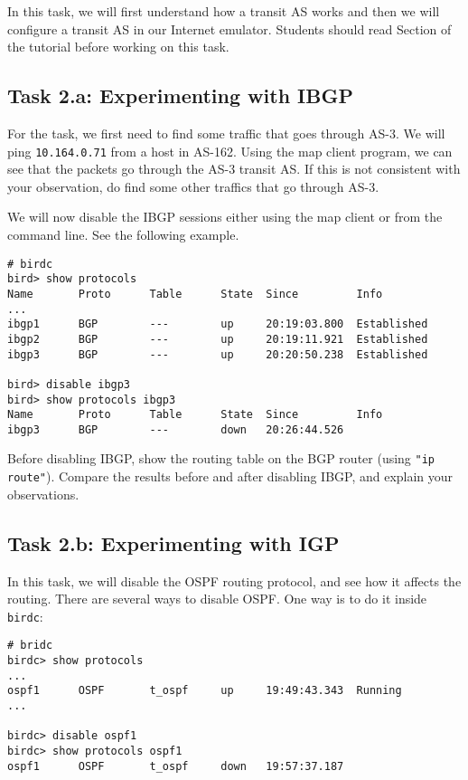 In this task, we will first understand how a transit AS works and
then we will configure a transit AS in our Internet emulator. 
Students should read Section \transitas of the tutorial before working on this task.

\subsection{Task 2.a: Experimenting with IBGP} 


For the task, we first need to find some traffic that 
goes through AS-3. We will ping \texttt{10.164.0.71} from a host in AS-162. Using the 
map client program, we can see that the packets go through
the AS-3 transit AS. If this is not consistent with your observation,
do find some other traffics that go through AS-3. 

We will now disable the IBGP sessions either using the map client or 
from the command line. See the following example.

\begin{lstlisting}
# birdc
bird> show protocols
Name       Proto      Table      State  Since         Info
...
ibgp1      BGP        ---        up     20:19:03.800  Established
ibgp2      BGP        ---        up     20:19:11.921  Established
ibgp3      BGP        ---        up     20:20:50.238  Established

bird> disable ibgp3 
bird> show protocols ibgp3
Name       Proto      Table      State  Since         Info
ibgp3      BGP        ---        down   20:26:44.526
\end{lstlisting}
 
Before disabling IBGP, show the routing table 
on the BGP router (using \texttt{"ip route"}). Compare the 
results before and after disabling IBGP, and explain
your observations. 


\subsection{Task 2.b: Experimenting with IGP} 

In this task, we will disable the OSPF routing protocol, and see 
how it affects the routing. There are several ways to disable
OSPF. One way is to do it inside \texttt{birdc}: 

\begin{lstlisting}
# bridc
birdc> show protocols
...
ospf1      OSPF       t_ospf     up     19:49:43.343  Running
...

birdc> disable ospf1
birdc> show protocols ospf1
ospf1      OSPF       t_ospf     down   19:57:37.187
\end{lstlisting}
 

